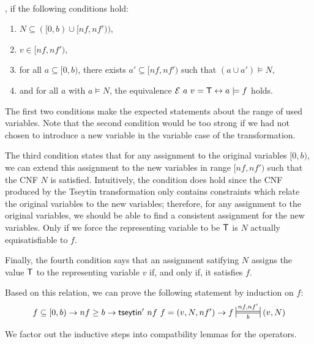 \newcommand{\Frepr}[3]{\sdststile{\ensuremath{#3}}{\ensuremath{#1, #2}}}
\begin{definition}~\\
  \mnotec[tseytin_formula_repr]{$f \Frepr{nf}{nf'}{b} (v, N)$}, if the following conditions hold:
  \begin{enumerate}
    \item $N \subseteq ([0, b) \cup [nf, nf'))$,
    \item $v \in [nf, nf')$,
    \item for all $a \subseteq [0, b)$, there exists $a' \subseteq [nf, nf')$ such that $(a \cup a') \models N$,
    \item and for all $a$ with $a \models N$, the equivalence $\mathcal{E}~a~v = \mathsf{T} \leftrightarrow a \models f$ holds.
  \end{enumerate}
\end{definition}

The first two conditions make the expected statements about the range of used variables. Note that the second condition would be too strong if we had not chosen to introduce a new variable in the variable case of the transformation.

The third condition states that for any assignment to the original variables $[0, b)$, we can extend this assignment to the new variables in range $[nf, nf')$ such that the CNF $N$ is satisfied. 
Intuitively, the condition does hold since the CNF produced by the Tseytin transformation only contains constraints which relate the original variables to the new variables; therefore, for any assignment to the original variables, we should be able to find a consistent assignment for the new variables. 
Only if we force the representing variable to be $\mathsf{T}$ is $N$ actually equisatisfiable to $f$.

Finally, the fourth condition says that an assignment satifying $N$ assigns the value $\mathsf{T}$ to the representing variable $v$ if, and only if, it satisfies $f$. 

Based on this relation, we can prove the following statement by induction on $f$: 
\[f \subseteq [0, b) \rightarrow nf \ge b \rightarrow \tseytin'~nf~f = (v, N, nf') \rightarrow f \Frepr{nf}{nf'}{b} (v, N) \]

We factor out the inductive steps into compatbility lemmas for the operators. 

